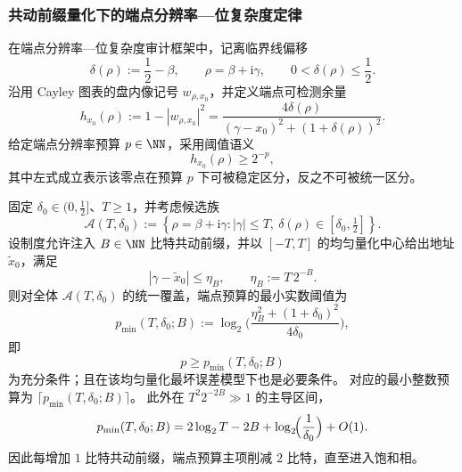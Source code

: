\subsubsection{共动前缀量化下的端点分辨率—位复杂度定律}\label{subsubsec:xi-comoving-prefix-endpoint-budget-laws}
在端点分辨率—位复杂度审计框架中，记离临界线偏移
\[
\delta(\rho):=\frac12-\beta,\qquad
\rho=\beta+\mathrm{i}\gamma,\qquad
0<\delta(\rho)\le \frac12.
\]
沿用 Cayley 图表的盘内像记号 \(w_{\rho,x_0}\)，并定义端点可检测余量
\begin{equation}\label{eq:xi-comoving-prefix-endpoint-margin}
h_{x_0}(\rho)
:=
1-|w_{\rho,x_0}|^2
=
\frac{4\delta(\rho)}{(\gamma-x_0)^2+(1+\delta(\rho))^2}.
\end{equation}
给定端点分辨率预算 \(p\in\NN\)，采用阈值语义
\begin{equation}\label{eq:xi-comoving-prefix-detection-threshold}
h_{x_0}(\rho)\ge 2^{-p},
\end{equation}
其中左式成立表示该零点在预算 \(p\) 下可被稳定区分，反之不可被统一区分。

\begin{theorem}[量化共动前缀下的端点屏障削减律]\label{thm:xi-comoving-prefix-endpoint-barrier-law}
固定 \(\delta_0\in(0,\tfrac12]\)、\(T\ge 1\)，并考虑候选族
\[
\mathcal{A}(T,\delta_0)
:=
\left\{
\rho=\beta+\mathrm{i}\gamma:
|\gamma|\le T,\ 
\delta(\rho)\in[\delta_0,\tfrac12]
\right\}.
\]
设制度允许注入 \(B\in\NN\) 比特共动前缀，并以 \([-T,T]\) 的均匀量化中心给出地址 \(\tilde x_0\)，满足
\[
|\gamma-\tilde x_0|
\le
\eta_B,
\qquad
\eta_B:=T\,2^{-B}.
\]
则对全体 \(\mathcal{A}(T,\delta_0)\) 的统一覆盖，端点预算的最小实数阈值为
\begin{equation}\label{eq:xi-comoving-prefix-pmin}
p_{\min}(T,\delta_0;B)
:=
\log_2\!\Biggl(
\frac{\eta_B^2+(1+\delta_0)^2}{4\delta_0}
\Biggr),
\end{equation}
即
\[
p\ge p_{\min}(T,\delta_0;B)
\]
为充分条件；且在该均匀量化最坏误差模型下也是必要条件。
对应的最小整数预算为 \(\lceil p_{\min}(T,\delta_0;B)\rceil\)。
此外在 \(T^2 2^{-2B}\gg 1\) 的主导区间，
\begin{equation}\label{eq:xi-comoving-prefix-pmin-asymptotic}
p_{\min}(T,\delta_0;B)
=
2\log_2 T-2B+\log_2\!\Bigl(\frac1{\delta_0}\Bigr)+O(1).
\end{equation}
因此每增加 \(1\) 比特共动前缀，端点预算主项削减 \(2\) 比特，直至进入饱和相。
\end{theorem}


